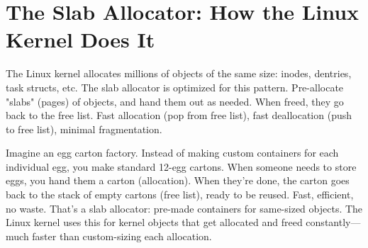 \section{The Slab Allocator: How the Linux Kernel Does It}

The Linux kernel allocates millions of objects of the same size: inodes, dentries, task structs, etc. The slab allocator is optimized for this pattern. Pre-allocate "slabs" (pages) of objects, and hand them out as needed. When freed, they go back to the free list. Fast allocation (pop from free list), fast deallocation (push to free list), minimal fragmentation.

Imagine an egg carton factory. Instead of making custom containers for each individual egg, you make standard 12-egg cartons. When someone needs to store eggs, you hand them a carton (allocation). When they're done, the carton goes back to the stack of empty cartons (free list), ready to be reused. Fast, efficient, no waste. That's a slab allocator: pre-made containers for same-sized objects. The Linux kernel uses this for kernel objects that get allocated and freed constantly—much faster than custom-sizing each allocation.

